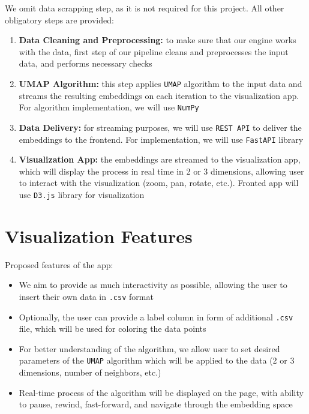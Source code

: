 \documentclass{article}
\begin{document}
We omit data scrapping step, as it is not required for this project.
All other obligatory steps are provided:
\begin{enumerate}
	\item \textbf{Data Cleaning and Preprocessing:} to make sure that
	      our engine works with the data, first step of our pipeline cleans
	      and preprocesses the input data, and performs necessary checks
	\item \textbf{UMAP Algorithm:} this step applies \texttt{UMAP}
	      algorithm to the input data and streams the resulting
	      embeddings on each iteration to the visualization app. For
	      algorithm implementation, we will use \texttt{NumPy}
	\item \textbf{Data Delivery:} for streaming purposes, we will use
	      \texttt{REST API} to deliver the embeddings to the frontend.
	      For implementation, we will use \texttt{FastAPI} library
	\item \textbf{Visualization App:} the embeddings are streamed to the
	      visualization app, which will display the process in real time
	      in 2 or 3 dimensions, allowing user to interact with the
	      visualization (zoom, pan, rotate, etc.). Fronted app will use
	      \texttt{D3.js} library for visualization
\end{enumerate}

\section{Visualization Features}
Proposed features of the app:
\begin{itemize}
	\item We aim to provide as much interactivity as possible, allowing
	      the user to insert their own data in \texttt{.csv} format
	\item Optionally, the user can provide a label column in form of
	      additional \texttt{.csv} file, which will be used for coloring
	      the data points
	\item For better understanding of the algorithm, we allow user to
	      set desired parameters of the \texttt{UMAP} algorithm which will
	      be applied to the data
	      (2 or 3 dimensions, number of neighbors, etc.)
	\item Real-time process of the algorithm will be displayed
	      on the page, with ability to pause, rewind, fast-forward, and
	      navigate through the embedding space
\end{itemize}
\end{document}
